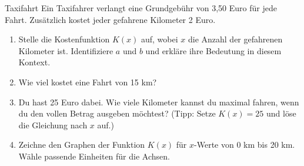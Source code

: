 \begin{aufgabenumgebung}{Taxifahrt}
Ein Taxifahrer verlangt eine Grundgebühr von 3,50 Euro für jede Fahrt. Zusätzlich kostet jeder gefahrene Kilometer 2 Euro.
\begin{enumerate}
    \item Stelle die Kostenfunktion $K(x)$ auf, wobei $x$ die Anzahl der gefahrenen Kilometer ist. Identifiziere $a$ und $b$ und erkläre ihre Bedeutung in diesem Kontext.
    \item Wie viel kostet eine Fahrt von 15 km?
    \item Du hast 25 Euro dabei. Wie viele Kilometer kannst du maximal fahren, wenn du den vollen Betrag ausgeben möchtest? (Tipp: Setze $K(x)=25$ und löse die Gleichung nach $x$ auf.)
    \item Zeichne den Graphen der Funktion $K(x)$ für $x$-Werte von 0 km bis 20 km. Wähle passende Einheiten für die Achsen.
\end{enumerate}
\end{aufgabenumgebung}


